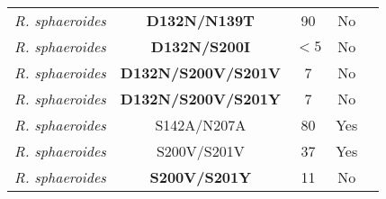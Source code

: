 \begin{table}
\begin{center}
\begin{singlespaced}
{\begin{tabular}{l|c|c|c|c}
    \emph{R. sphaeroides} & \textbf{D132N/N139T} & 90 & No & \cite{Zhu:2010p8237} \\
    \emph{R. sphaeroides} & \textbf{D132N/S200I} & $<5$ & No & \cite{Lee:2010p8614} \\
    \emph{R. sphaeroides} & \textbf{D132N/S200V/S201V} & 7 & No & \cite{Lee:2010p8614} \\
    \emph{R. sphaeroides} & \textbf{D132N/S200V/S201Y} & 7 & No & \cite{Lee:2010p8614} \\
    \emph{R. sphaeroides} & S142A/N207A & 80 & Yes & \cite{Zhu:2010p8237} \\
    \emph{R. sphaeroides} & S200V/S201V & 37 & Yes & \cite{Lee:2010p8614} \\
    \emph{R. sphaeroides} & \textbf{S200V/S201Y} & 11 & No & \cite{Lee:2010p8614} \\
    \hline
    \end{tabular}
    }
    \end{singlespaced}
    \end{center}
\end{table}

